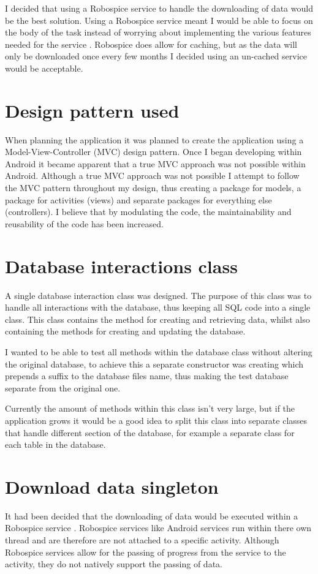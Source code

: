 I decided that using a Robospice service to handle the downloading of data would be the best solution. Using a Robospice service meant I would be able to focus on the body of the task instead of worrying about implementing the various features needed for the service \cite{robospice}. Robospice does allow for caching, but as the data will only be downloaded once every few months I decided using an un-cached service would be acceptable.


\section{Design pattern used}

When planning the application it was planned to create the application using a Model-View-Controller (MVC) \cite{mvc} design pattern. Once I began developing within Android it became apparent that a true MVC approach was not possible within Android. Although a true MVC approach was not possible I attempt to follow the MVC pattern throughout my design, thus creating a package for models, a package for activities (views) and separate packages for everything else (controllers). I believe that by modulating the code, the maintainability and reusability of the code has been increased.

\section{Database interactions class}
A single database interaction class was designed. The purpose of this class was to handle all interactions with the database, thus keeping all SQL code into a single class. This class contains the method for creating and retrieving data, whilst also containing the methods for creating and updating the database.

I wanted to be able to test all methods within the database class without altering the original database, to achieve this a separate constructor was creating which prepends a suffix to the database files name, thus making the test database separate from the original one.

Currently the amount of methods within this class isn't very large, but if the application grows it would be a good idea to split this class into separate classes that handle different section of the database, for example a separate class for each table in the database.

\section{Download data singleton}
It had been decided that the downloading of data would be executed within a Robospice service \cite{robospice}. Robospice services like Android services run within there own thread \cite{robospice} and are therefore are not attached to a specific activity. Although Robospice services allow for the passing of progress from the service to the activity, they do not natively support the passing of data.

